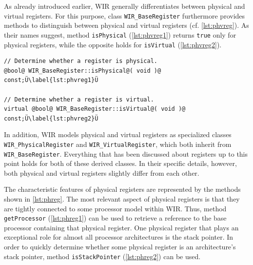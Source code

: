 As already introduced earlier, \gls{WIR} generally differentiates between physical and virtual registers.
For this purpose, class \texttt{WIR\_BaseRegister} furthermore provides methods to distinguish between physical and virtual registers (cf. \cref{lst:phvreg}).
As their names suggest, method \texttt{isPhysical} (\cref{lst:phvreg1}) returns \texttt{true} only for physical registers, while the opposite holds for \texttt{isVirtual} (\cref{lst:phvreg2}).

\begin{lstlisting}[style=code,float=ht,caption={Distinction Between Physical and Virtual Registers in Class \texttt{WIR\_BaseRegister}},label=lst:phvreg]
// Determine whether a register is physical.
@bool@ WIR_BaseRegister::isPhysical@( void )@ const;Ü\label{lst:phvreg1}Ü

// Determine whether a register is virtual.
virtual @bool@ WIR_BaseRegister::isVirtual@( void )@ const;Ü\label{lst:phvreg2}Ü
\end{lstlisting}

In addition, \gls{WIR} models physical and virtual registers as specialized classes \texttt{WIR\_PhysicalRegister} and \texttt{WIR\_VirtualRegister}, which both inherit from \texttt{WIR\_BaseRegister}.
Everything that has been discussed about registers up to this point holds for both of these derived classes.
In their specific details, however, both physical and virtual registers slightly differ from each other.

The characteristic features of physical registers are represented by the methods shown in \cref{lst:phreg}.
The most relevant aspect of physical registers is that they are tightly connected to some processor model within \gls{WIR}.
Thus, method \texttt{getProcessor} (\cref{lst:phreg1}) can be used to retrieve a reference to the base processor containing that physical register.
One physical register that plays an exceptional role for almost all processor architectures is the stack pointer.
In order to quickly determine whether some physical register is an architecture's stack pointer, method \texttt{isStackPointer} (\cref{lst:phreg2}) can be used.

